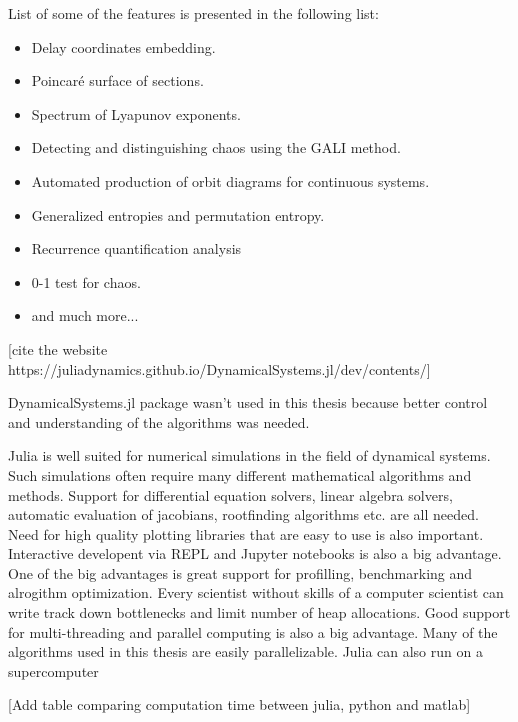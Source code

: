 List of some of the features is presented in the following list:
\begin{itemize}
    \item Delay coordinates embedding.
    \item Poincaré surface of sections.
    \item Spectrum of Lyapunov exponents.
    \item Detecting and distinguishing chaos using the GALI method.
    \item Automated production of orbit diagrams for continuous systems.
    \item Generalized entropies and permutation entropy.
    \item Recurrence quantification analysis
    \item 0-1 test for chaos.
    \item and much more...
\end{itemize} [cite the website https://juliadynamics.github.io/DynamicalSystems.jl/dev/contents/]

DynamicalSystems.jl package wasn't used in this thesis because better control and understanding of the algorithms was needed.
\par
Julia is well suited for numerical simulations in the field of dynamical systems.
Such simulations often require many different mathematical algorithms and methods.
Support for differential equation solvers, linear algebra solvers, automatic evaluation of jacobians, rootfinding algorithms etc. are all needed.
Need for high quality plotting libraries that are easy to use is also important.
Interactive developent via REPL and Jupyter notebooks is also a big advantage.
One of the big advantages is great support for profilling, benchmarking and alrogithm optimization.
Every scientist without skills of a computer scientist can write track down bottlenecks and limit number of heap allocations.
Good support for multi-threading and parallel computing is also a big advantage.
Many of the algorithms used in this thesis are easily parallelizable.
Julia can also run on a supercomputer \cite{Regier2016-vq}

[Add table comparing computation time between julia, python and matlab]

